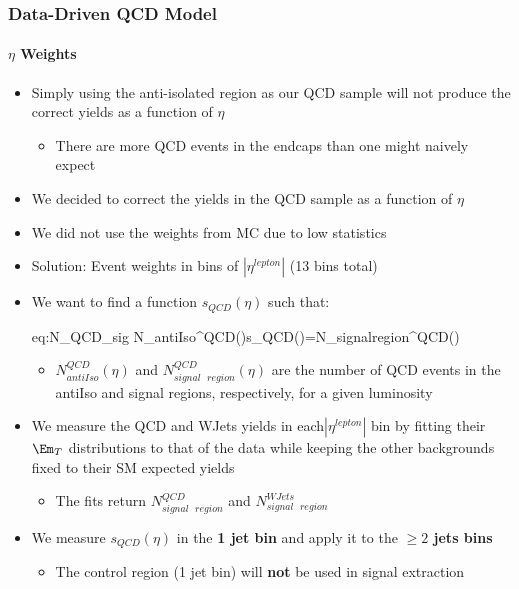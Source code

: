 \begin{frame}
	\frametitle{Data-Driven QCD Model}
	\framesubtitle{$\eta$ Weights}
	\vspace*{-0.24cm}
	\begin{block}{}
		\begin{itemize}
			\footnotesize
			\item Simply using the anti-isolated region as our QCD sample will not produce the correct yields as a function of $\eta$
			\begin{itemize}
				\footnotesize
				\item There are more QCD events in the endcaps than one might naively expect
			\end{itemize}
			\item We decided to correct the yields in the QCD sample as a function of $\eta$
			\item We did not use the weights from MC due to low statistics
			\item Solution: Event weights in bins of $|\eta^{lepton}|$ (13 bins total)
			\item We want to find a function $s_{QCD}\left(\eta\right)$ such that:
			\begin{aeq}{eq:N_QCD_sig}
				N_{antiIso}^{QCD}\left(\eta\right)s_{QCD}\left(\eta\right)=N_{signal\text{ }region}^{QCD}\left(\eta\right)
			\end{aeq}
			\begin{itemize}
				\footnotesize
				\item $N_{antiIso}^{QCD}\left(\eta\right)$ and $N_{signal\text{ }region}^{QCD}\left(\eta\right)$ are the number of QCD events in the antiIso and signal regions, respectively, for a given luminosity
			\end{itemize}
			\item We measure the QCD and WJets yields in each$|\eta^{lepton}|$ bin by fitting their $\Em_{T}$ distributions to that of the data while keeping the other backgrounds fixed to their SM expected yields
			\begin{itemize}
				\footnotesize
				\item The fits return $N_{signal\text{ }region}^{QCD}$ and $N_{signal\text{ }region}^{WJets}$
			\end{itemize}
			\item We measure $s_{QCD}\left(\eta\right)$ in the {\color{red}\textbf{1 jet bin}} and apply it to the {\color{blue}\textbf{$\geqslant2$ jets bins}}
			\begin{itemize}
				\footnotesize
				\item The control region (1 jet bin) will \textbf{not} be used in signal extraction
			\end{itemize}
		\end{itemize}
	\end{block}
\end{frame}

